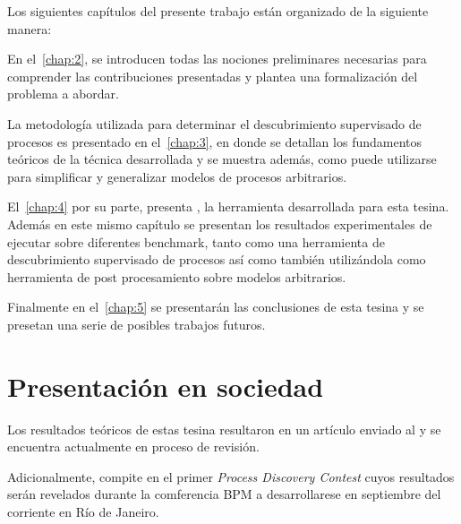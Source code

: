 Los siguientes capítulos del presente trabajo están organizado de la siguiente manera:

En el~\autoref{chap:2}, se introducen todas las nociones preliminares necesarias para comprender las contribuciones 
presentadas y plantea una formalización del problema a abordar.

La metodología utilizada para determinar el descubrimiento supervisado de procesos es presentado en el~\autoref{chap:3}, 
en donde se detallan los fundamentos teóricos de la técnica desarrollada y se muestra además, como puede utilizarse para simplificar
y generalizar modelos de procesos arbitrarios.

El~\autoref{chap:4} por su parte, presenta \pachtool, la herramienta desarrollada para esta tesina. Además en este mismo capítulo
se presentan los resultados experimentales de ejecutar \pachtool sobre diferentes benchmark, tanto como una herramienta de descubrimiento
supervisado de procesos así como también utilizándola como herramienta de post procesamiento sobre modelos arbitrarios.

Finalmente en el~\autoref{chap:5} se presentarán las conclusiones de esta tesina y se presetan una serie de posibles trabajos futuros.

\section*{Presentación en sociedad}
\label{sec:presentacion}

Los resultados teóricos de estas tesina resultaron en un artículo enviado al  y se encuentra actualmente
en  proceso de revisión.

Adicionalmente, \pachtool compite en el primer \textit{Process Discovery Contest} cuyos resultados serán revelados durante la comferencia
BPM a desarrollarese en septiembre del corriente en Río de Janeiro.

